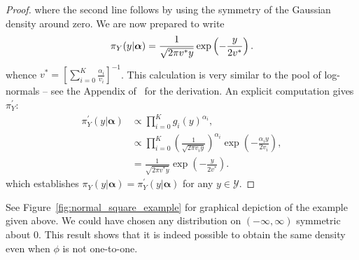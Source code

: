 \documentclass[a4paper, notitlepage, 10pt]{article}
\begin{document}
\begin{proof}
where the second line follows by using the symmetry of the Gaussian density around zero.
We are now prepared to write 
\begin{equation}
 \pi_Y(y |  \boldsymbol \alpha) = \frac{1}{\sqrt{2\pi v^\ast y}} \exp\left(-\frac{y}{2v^\ast}\right). \\
\end{equation}
whence $v^\ast =  \left[\sum_{i=0}^K \frac{\alpha_i}{v_i} \right]^{-1}$.
This calculation is very similar to the pool of log-normals -- see the Appendix of~\cite{Carvalho2019} for the derivation.
An explicit computation gives $\pi^{\prime}_{Y}$:
\begin{align}
 \pi^{\prime}_{Y}(y|  \boldsymbol \alpha) &\propto \prod_{i=0}^K g_i(y)^{\alpha_i}, \\
 & \propto \prod_{i=0}^K \left( \frac{1}{\sqrt{2\pi v_i y}} \right)^{\alpha_i} \exp\left(-\frac{\alpha_i y}{2v_i}\right),\\
 &= \frac{1}{\sqrt{2\pi v^\ast y}} \exp\left(-\frac{y}{2v^\ast}\right).
\end{align}
which establishes $ \pi_{Y}(y|  \boldsymbol \alpha) =  \pi^{\prime}_{Y}(y|  \boldsymbol \alpha)$ for any $ y \in \mathcal{Y}$.
\end{proof}
See Figure~\ref{fig:normal_square_example} for graphical depiction of the example given above.
We could have chosen any distribution on $(-\infty, \infty)$ symmetric about $0$.
This result shows that it is indeed possible to obtain the same density even when $\phi$ is not one-to-one.
\end{document}
